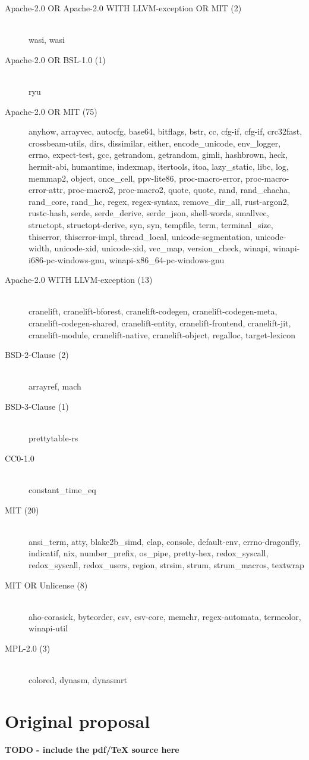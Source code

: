 \begin{description}
    \item[Apache-2.0 OR Apache-2.0 WITH LLVM-exception OR MIT (2)] \hfill \\ wasi, wasi
    \item[Apache-2.0 OR BSL-1.0 (1)] \hfill \\ ryu
    \item[Apache-2.0 OR MIT (75)] anyhow, arrayvec, autocfg, base64, bitflags, bstr, cc,
          cfg-if, cfg-if, crc32fast, crossbeam-utils, dirs, dissimilar, either, encode\_unicode,
          env\_logger,
          errno, expect-test, gcc, getrandom, getrandom, gimli, hashbrown, heck, hermit-abi,
          humantime,
          indexmap, itertools, itoa, lazy\_static, libc, log, memmap2, object, once\_cell,
          ppv-lite86,
          proc-macro-error, proc-macro-error-attr, proc-macro2, proc-macro2, quote, quote, rand,
          rand\_chacha, rand\_core, rand\_hc, regex, regex-syntax, remove\_dir\_all, rust-argon2,
          rustc-hash,
          serde, serde\_derive, serde\_json, shell-words, smallvec, structopt, structopt-derive,
          syn, syn,
          tempfile, term, terminal\_size, thiserror, thiserror-impl, thread\_local,
          unicode-segmentation,
          unicode-width, unicode-xid, unicode-xid, vec\_map, version\_check, winapi,
          winapi-i686-pc-windows-gnu, winapi-x86\_64-pc-windows-gnu
    \item[Apache-2.0 WITH LLVM-exception (13)] \hfill \\ cranelift, cranelift-bforest,
          cranelift-codegen,
          cranelift-codegen-meta, cranelift-codegen-shared, cranelift-entity, cranelift-frontend,
          cranelift-jit, cranelift-module, cranelift-native, cranelift-object, regalloc,
          target-lexicon
    \item[BSD-2-Clause (2)] \hfill \\ arrayref, mach
    \item[BSD-3-Clause (1)] \hfill \\ prettytable-rs
    \item[CC0-1.0] \hfill \\ constant\_time\_eq
    \item[MIT (20)] \hfill \\ ansi\_term, atty, blake2b\_simd, clap, console, default-env,
          errno-dragonfly, indicatif, nix, number\_prefix, os\_pipe, pretty-hex, redox\_syscall,
          redox\_syscall, redox\_users, region, strsim, strum, strum\_macros, textwrap
    \item[MIT OR Unlicense (8)] \hfill \\ aho-corasick, byteorder, csv, csv-core, memchr,
          regex-automata, termcolor, winapi-util
    \item[MPL-2.0 (3)] \hfill \\ colored, dynasm, dynasmrt
\end{description}

\chapter{Original proposal}

\textbf{TODO - include the pdf/TeX source here}